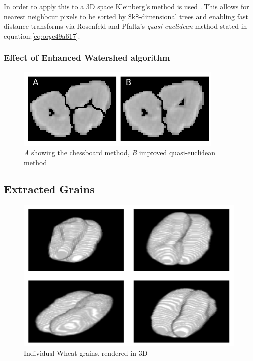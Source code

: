 \documentclass[11pt]{report}
\begin{document}
In order to apply this to a 3D space Kleinberg's method is used  \cite{Kleinberg1997}. This allows for nearest neighbour pixels to be sorted by \$k\$-dimensional trees
and enabling fast distance transforms via Rosenfeld and Pfaltz's \emph{quasi-euclidean} method stated in equation:\ref{eq:orge49a617}.
\subsubsection{Effect of Enhanced Watershed algorithm}
\label{sec:org3aea983}
\begin{center}
\begin{figure}[htbp]
\centering
\includegraphics[width=10cm]{./images/chess_quasi.png}
\caption{\label{fig:orgdeda169}
\emph{A} showing the chessboard method, \emph{B} improved quasi-euclidean method}
\end{figure}
\end{center}

\subsection{Extracted Grains}
\label{sec:org43f8b21}

\begin{figure}[htbp]
\centering
\includegraphics[width=13cm]{./images/ctgrains.png}
\caption{\label{fig:org0f0c635}
Individual Wheat grains, rendered in 3D}
\end{figure}
\end{document}
